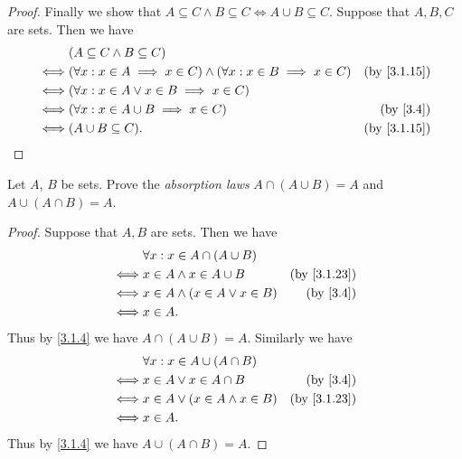 \begin{proof}
  Finally we show that \(A \subseteq C \land B \subseteq C \iff A \cup B \subseteq C\).
  Suppose that \(A, B, C\) are sets.
  Then we have
  \begin{align*}
         & (A \subseteq C \land B \subseteq C)                                                                             \\
    \iff & (\forall x : x \in A \implies x \in C) \land (\forall x : x \in B \implies x \in C) & \text{(by \cref{3.1.15})} \\
    \iff & (\forall x : x \in A \lor x \in B \implies x \in C)                                                             \\
    \iff & (\forall x : x \in A \cup B \implies x \in C)                                       & \text{(by \cref{3.4})}    \\
    \iff & (A \cup B \subseteq C).                                                             & \text{(by \cref{3.1.15})}
  \end{align*}
\end{proof}

\begin{exercise}\label{ex 3.1.8}
  Let \(A\), \(B\) be sets.
  Prove the \emph{absorption laws} \(A \cap (A \cup B) = A\) and \(A \cup (A \cap B) = A\).
\end{exercise}

\begin{proof}
  Suppose that \(A, B\) are sets.
  Then we have
  \begin{align*}
         & \forall x : x \in A \cap (A \cup B)                              \\
    \iff & x \in A \land x \in A \cup B         & \text{(by \cref{3.1.23})} \\
    \iff & x \in A \land (x \in A \lor x \in B) & \text{(by \cref{3.4})}    \\
    \iff & x \in A.
  \end{align*}
  Thus by \cref{3.1.4} we have \(A \cap (A \cup B) = A\).
  Similarly we have
  \begin{align*}
         & \forall x : x \in A \cup (A \cap B)                              \\
    \iff & x \in A \lor x \in A \cap B          & \text{(by \cref{3.4})}    \\
    \iff & x \in A \lor (x \in A \land x \in B) & \text{(by \cref{3.1.23})} \\
    \iff & x \in A.
  \end{align*}
  Thus by \cref{3.1.4} we have \(A \cup (A \cap B) = A\).
\end{proof}

